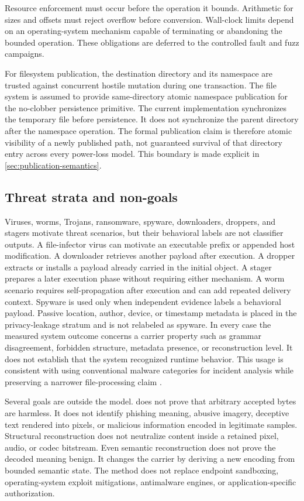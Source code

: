 Resource enforcement must occur before the operation it bounds. Arithmetic for
sizes and offsets must reject overflow before conversion. Wall-clock limits
depend on an operating-system mechanism capable of terminating or abandoning
the bounded operation. These obligations are deferred to the controlled fault
and fuzz campaigns.

For filesystem publication, the destination directory and its namespace are
trusted against concurrent hostile mutation during one transaction. The file
system is assumed to provide same-directory atomic namespace publication for
the no-clobber persistence primitive. The current implementation synchronizes
the temporary file before persistence. It does not synchronize the parent
directory after the namespace operation. The formal publication claim is
therefore atomic visibility of a newly published path, not guaranteed survival
of that directory entry across every power-loss model. This boundary is made
explicit in \cref{sec:publication-semantics}.

\subsection{Threat strata and non-goals}

Viruses, worms, Trojans, ransomware, spyware, downloaders, droppers, and stagers
motivate threat scenarios, but their behavioral labels are not classifier
outputs. A file-infector virus can motivate an executable prefix or appended
host modification. A downloader retrieves another payload after execution. A
dropper extracts or installs a payload already carried in the initial object. A
stager prepares a later execution phase without requiring either mechanism.
A worm scenario requires self-propagation after execution and can add repeated
delivery context. Spyware is used only when independent evidence labels a
behavioral payload. Passive location, author, device, or timestamp metadata is
placed in the privacy-leakage stratum and is not relabeled as spyware. In every
case the measured system outcome concerns a carrier property such as grammar
disagreement, forbidden structure, metadata presence, or reconstruction level.
It does not establish that the system recognized runtime behavior. This usage is
consistent with using conventional malware categories for incident analysis
while preserving a narrower file-processing claim \cite{nist80083}.

Several goals are outside the model. \AFD{} does not prove that arbitrary
accepted bytes are harmless. It does not identify phishing meaning, abusive
imagery, deceptive text rendered into pixels, or malicious information encoded
in legitimate samples. Structural reconstruction does not neutralize content
inside a retained pixel, audio, or codec bitstream. Even semantic reconstruction
does not prove the decoded meaning benign. It changes the carrier by deriving a
new encoding from bounded semantic state. The method does not replace endpoint
sandboxing, operating-system exploit mitigations, antimalware engines, or
application-specific authorization.


